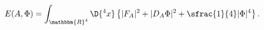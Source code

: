 \begin{equation}\label{swa2}
  E(A,\Phi)=\int_{\mathbbm{R}^4}\D{ ^4x}\left\{|F_A|^2+
  |D_A\Phi|^2+\sfrac{1}{4}|\Phi|^4\right\}.
\end{equation}

